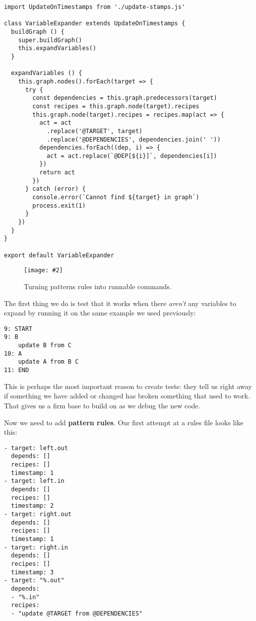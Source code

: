 \documentclass[krantzl]{krantz}
\newcommand{\figpdf}[4]{\begin{figure}%
\centering%
\texttt{[image: \#2]}%
\caption{#3}%
\label{#1}%
\end{figure}}
\newcommand{\glossref}[1]{\textbf{#1}}
\begin{document}
\begin{lstlisting}[frame=tblr]
import UpdateOnTimestamps from './update-stamps.js'

class VariableExpander extends UpdateOnTimestamps {
  buildGraph () {
    super.buildGraph()
    this.expandVariables()
  }

  expandVariables () {
    this.graph.nodes().forEach(target => {
      try {
        const dependencies = this.graph.predecessors(target)
        const recipes = this.graph.node(target).recipes
        this.graph.node(target).recipes = recipes.map(act => {
          act = act
            .replace('@TARGET', target)
            .replace('@DEPENDENCIES', dependencies.join(' '))
          dependencies.forEach((dep, i) => {
            act = act.replace(`@DEP[${i}]`, dependencies[i])
          })
          return act
        })
      } catch (error) {
        console.error(`Cannot find ${target} in graph`)
        process.exit(1)
      }
    })
  }
}

export default VariableExpander
\end{lstlisting}


\figpdf{build-manager-pattern-rules}{./build-manager/pattern-rules.pdf}{Turning patterns rules into runnable commands.}{0.6}


The first thing we do is test that it works when there \emph{aren’t} any variables to expand
by running it on the same example we used previously:


\begin{lstlisting}[frame=tblr,backgroundcolor=\color{black!5}]
9: START
9: B
    update B from C
10: A
    update A from B C
11: END
\end{lstlisting}



\noindent This is perhaps the most important reason to create tests:
they tell us right away if something we have added or changed
has broken something that used to work.
That gives us a firm base to build on as we debug the new code.


\newpage


Now we need to add \glossref{pattern rules}.
Our first attempt at a rules file looks like this:


\begin{lstlisting}[frame=tblr]
- target: left.out
  depends: []
  recipes: []
  timestamp: 1
- target: left.in
  depends: []
  recipes: []
  timestamp: 2
- target: right.out
  depends: []
  recipes: []
  timestamp: 1
- target: right.in
  depends: []
  recipes: []
  timestamp: 3
- target: "%.out"
  depends:
  - "%.in"
  recipes:
  - "update @TARGET from @DEPENDENCIES"
\end{lstlisting}
\end{document}
